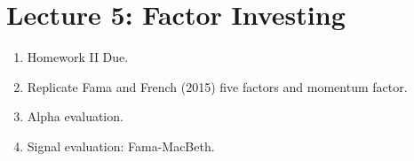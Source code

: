 \documentclass[12pts]{article}
\begin{document}
\section*{Lecture 5: Factor Investing}
\begin{enumerate}
	\item Homework II Due.
	\item Replicate Fama and French (2015) five factors and momentum factor.
	\item Alpha evaluation.
	\item Signal evaluation: Fama-MacBeth.
\end{enumerate}	
\end{document}
